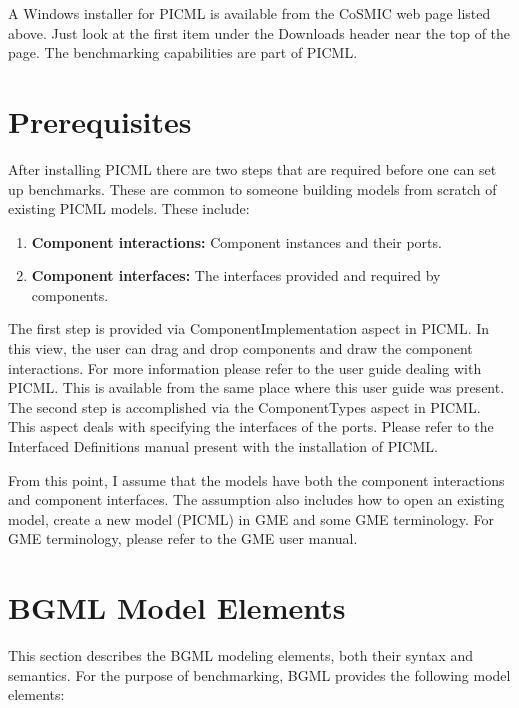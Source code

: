 \documentclass[onecolumn]{article}
\begin{document}
A Windows installer for PICML is available from the CoSMIC web page
listed above. Just look at the first item under the Downloads header
near the top of the page. The benchmarking capabilities are part of
PICML.

\section* {Prerequisites}
After installing PICML there are two steps that are
required before one can set up benchmarks.  These are common to
someone building models from scratch of existing PICML models. These
include:
\sqztiny
\begin{enumerate}\crunchlist
\item {\bf Component interactions:} Component instances and their ports.
\item {\bf Component interfaces:} The interfaces provided and required by
components.
\end{enumerate}

\noindent The first step is provided via ComponentImplementation aspect in
PICML. In this view, the user can drag and drop components and draw
the component interactions. For more information please refer to the
user guide dealing with PICML. This is available from the same place
where this user guide was present. The second step is accomplished via
the ComponentTypes aspect in PICML. This aspect deals with specifying
the interfaces of the ports. Please refer to the Interfaced
Definitions manual present with the installation of PICML.

From this point, I assume that the models have both the component
interactions and component interfaces.  The assumption also includes
how to open an existing model, create a new model (PICML) in GME and
some GME terminology. For GME terminology, please refer to the GME
user manual.

\section*{BGML Model Elements}

This section describes the BGML modeling elements, both their syntax
and semantics. For the purpose of benchmarking, BGML provides the
following model elements:
\end{document}
